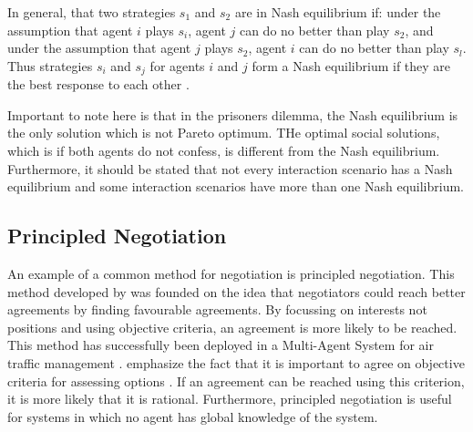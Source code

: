 In general, that two strategies $s_1$ and $s_2$ are in Nash equilibrium if: under the assumption that agent $i$ plays $s_i$, agent $j$ can do no better than play $s_2$, and under the assumption that agent $j$ plays $s_2$, agent $i$ can do no better than play $s_l$. Thus strategies $s_i$ and $s_j$ for agents $i$ and $j$ form a Nash equilibrium if they are the best response to each other  \citep{wooldridge2009introduction}. 

Important to note here is that in the prisoners dilemma, the Nash equilibrium is the only solution which is not Pareto optimum.  THe optimal social solutions, which is if both agents do not confess, is different from the Nash equilibrium.  Furthermore, it should be stated that not every interaction scenario has a Nash equilibrium and some interaction scenarios have more than one Nash equilibrium. 
\subsection{Principled Negotiation}
An example of a common method for negotiation is principled negotiation. This method developed by \citet{fisher1987getting} was founded on the idea that negotiators could reach better agreements by finding favourable agreements. By focussing on interests not positions and using objective criteria, an agreement is more likely to be reached. This method has successfully been deployed in a Multi-Agent System for air traffic management \citep{wangermann1998principled}. \citet{fisher1987getting} emphasize the fact that it is important to agree on objective criteria for assessing options \citep{fisher1987getting}. If an agreement can be reached using this criterion, it is more likely that it is rational. Furthermore, principled negotiation is useful for systems in which no agent has global knowledge of the system. 









